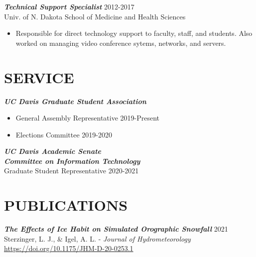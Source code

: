 \documentclass[margin]{res}
\begin{document}
\begin{resume}
\begin{itemize}
                \end{itemize}

                {\sl \textbf{Technical Support Specialist}} \hfill 2012-2017 \\
                Univ. of N. Dakota School of Medicine and Health Sciences \\
                \begin{itemize} \itemsep -2pt
                    \item Responsible  for  direct  technology  support  to  faculty,  staff,  and  students.  Also  worked  on managing video conference sytems, networks, and servers.

                \end{itemize}
\pagebreak
\section{SERVICE}
                {\sl \textbf{UC Davis Graduate Student Association}} \\
                
                \begin{itemize}
                    \item General Assembly Representative \hfill 2019-Present
                    \item Elections Committee \hfill 2019-2020
                \end{itemize} 

                {\sl \textbf{UC Davis Academic Senate \\ Committee on Information Technology}} \\
                Graduate Student Representative \hfill 2020-2021


\section{PUBLICATIONS}

                {\sl \textbf{The Effects of Ice Habit on Simulated Orographic Snowfall}} 
                \hfill 2021 \\ Sterzinger, L. J., \& Igel, A. L. - \textit{Journal of Hydrometeorology} \\ \href{https://doi.org/10.1175/JHM-D-20-0253.1}{https://doi.org/10.1175/JHM-D-20-0253.1}




\end{resume}
\end{document}
